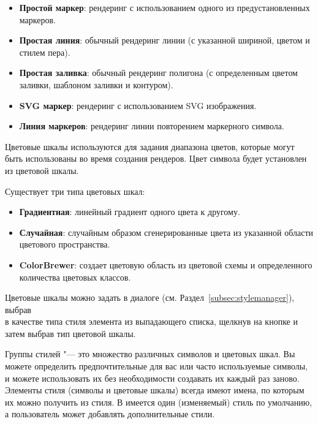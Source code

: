 
\begin{itemize}[label=--]
\item \textbf{Простой маркер}: рендеринг с использованием одного из
предустановленных маркеров.
\item \textbf{Простая линия}: обычный рендеринг линии (с указанной
шириной, цветом и стилем пера).
\item \textbf{Простая заливка}: обычный рендеринг полигона (с определенным
цветом заливки, шаблоном заливки и контуром).
\item \textbf{SVG маркер}: рендеринг с использованием SVG изображения.
\item \textbf{Линия маркеров}: рендеринг линии повторением маркерного символа.
\end{itemize}


Цветовые шкалы используются для задания диапазона цветов, которые могут
быть использованы во время создания рендеров. Цвет символа будет установлен
из цветовой шкалы.

Существует три типа цветовых шкал:

\begin{itemize}[label=--]
\item \textbf{Градиентная}: линейный градиент одного цвета к другому.
\item \textbf{Случайная}: случайным образом сгенерированные цвета из
указанной области цветового пространства.
\item \textbf{ColorBrewer}: создает цветовую область из цветовой схемы и
определенного количества цветовых классов.
\end{itemize}

Цветовые шкалы можно задать в диалоге 
(см. Раздел~\ref{subsec:stylemanager}), выбрав \\
 в качестве типа стиля
 элемента из выпадающего списка, щелкнув на кнопке 
 и затем выбрав тип цветовой шкалы.


Группы стилей "--- это множество различных символов и цветовых шкал. Вы
можете определить предпочтительные для вас или часто используемые символы,
и можете использовать их без необходимости создавать их каждый раз заново.
Элементы стиля (символы и цветовые шкалы) всегда имеют имена, по которым
их можно получить из стиля. В \qg имеется один (изменяемый) стиль по
умолчанию, а пользователь может добавлять дополнительные стили.


